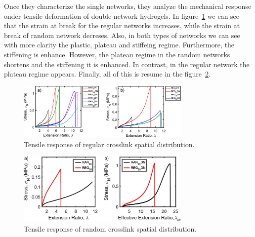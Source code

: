 Once they characterize the single networks, they analyze the mechanical response onder tensile deformation of double network hydrogels.
In figure~\ref{fig:RANnetworks} we can see that the strain at break for the regular networks increases, while the strain at break of random network decreses. 
Also, in both types of networks we can see with more clarity the plastic, plateau and stiffeing regime.
Furthermore, the stiffening is enhance.
However, the plateau regime in the random networks shortens and the stiffening it is enhanced.
In contrast, in the regular network the plateau regime appears.
Finally, all of this is resume in the figure~\ref{fig:REGRANDNcomparison}. 

\begin{figure}[ht!]
    \centering
    \includegraphics[width=0.75\textwidth]{figs/explainMechResponse/REGRANDN.jpeg}
    \caption{Tensile response of regular crosslink spatial distribution\citep{kongEffectCrossLinkHomogeneity2024}.}\label{fig:RANnetworks}
\end{figure}



\begin{figure}[ht!]
    \centering
    \includegraphics[width=0.75\textwidth]{figs/explainMechResponse/comparissonREGRANDN.jpeg}
    \caption{Tensile response of random crosslink spatial distribution\citep{kongEffectCrossLinkHomogeneity2024}.}\label{fig:REGRANDNcomparison}
\end{figure}


